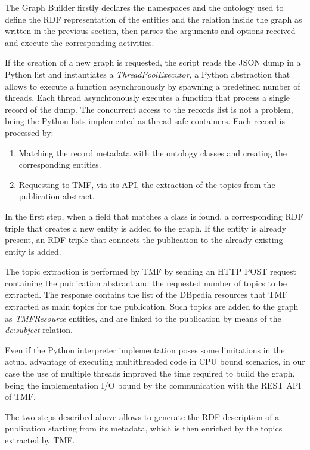 \documentclass[%
    corpo=13.5pt,
    twoside,
    oldstyle,
    tipotesi=magistrale,
    greek,
    evenboxes
]{toptesi}
\begin{document}
The Graph Builder firstly declares the namespaces and the ontology used to
define the RDF representation of the entities and the relation inside the graph
as written in the previous section, then parses the arguments and options
received and execute the corresponding activities.

If the creation of a new graph is requested, the script reads the JSON dump
in a Python list and instantiates a \emph{ThreadPoolExecutor}, a Python
abstraction that allows to execute a function asynchronously by spawning
a predefined number of threads.
Each thread asynchronously executes a function that process a single record of
the dump.
The concurrent access to the records list is not a problem, being the Python
lists implemented as thread safe containers.
Each record is processed by:

\begin{enumerate}
    \item Matching the record metadata with the ontology classes and
        creating the corresponding entities.
    \item Requesting to TMF, via its API, the extraction of the topics
        from the publication abstract.
\end{enumerate}

In the first step, when a field that matches a class is found, a corresponding
RDF triple that creates a new entity is added to the graph.
If the entity is already present, an RDF triple that connects the
publication to the already existing entity is added.

The topic extraction is performed by TMF by sending an HTTP POST request
containing the publication abstract and the requested number of topics to be extracted.
The response contains the list of the DBpedia resources that TMF
extracted as main topics for the publication. Such topics are added to the
graph as \emph{TMFResource} entities, and are
linked to the publication by means of the \emph{dc:subject} relation.

Even if the Python interpreter implementation poses some limitations in the
actual advantage of executing multithreaded code in CPU bound scenarios, in our
case the use of multiple threads  improved the time required to build
the graph, being the implementation I/O bound by the communication with the
REST API of TMF.

The two steps described above allows to generate the RDF description of a
publication starting from its metadata, which is then enriched by the topics
extracted by TMF.
\end{document}
